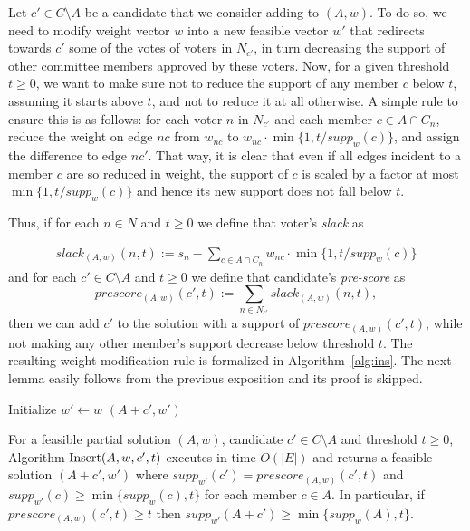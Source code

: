 Let $c'\in C\setminus A$ be a candidate that we consider adding to $(A,w)$. To do so, we need to modify weight vector $w$ into a new feasible vector $w'$ that redirects towards $c'$ some of the votes of voters in $N_{c'}$, in turn decreasing the support of other committee members approved by these voters. Now, for a given threshold $t\geq 0$, we want to make sure not to reduce the support of any member $c$ below $t$, assuming it starts above $t$, and not to reduce it at all otherwise. A simple rule to ensure this is as follows: for each voter $n$ in $N_{c'}$ and each member $c\in A\cap C_n$, reduce the weight on edge $nc$ from $w_{nc}$ to $w_{nc}\cdot \min\{1, t/supp_w(c)\}$, and assign the difference to edge $nc'$. That way, it is clear that even if all edges incident to a member $c$ are so reduced in weight, the support of $c$ is scaled by a factor at most $\min\{1, t/supp_w(c)\}$ and hence its new support does not fall below $t$.

Thus, if for each $n\in N$ and $t\geq 0$ we define that voter's \emph{slack} as

\begin{align}
    slack_{(A,w)}(n,t):= s_n - \sum_{c\in A\cap C_n} w_{nc} \cdot\min \Big\{ 1, t/supp_w(c)\Big\} \label{eq:slack}
\end{align}
%
and for each $c'\in C\setminus A$ and $t\geq 0$ we define that candidate's \emph{pre-score} as
%
\begin{equation}\label{eq:prescore}
    prescore_{(A,w)}(c',t) := \sum_{n\in N_{c'}} slack_{(A,w)}(n,t),
\end{equation}
%
then we can add $c'$ to the solution with a support of $prescore_{(A,w)}(c',t)$, while not making any other member's support decrease below threshold $t$. The resulting weight modification rule is formalized in Algorithm~\ref{alg:ins}. The next lemma easily follows from the previous exposition and its proof is skipped.

\begin{algorithm}[htb]\label{alg:ins}
\SetAlgoLined
{}
Initialize $w'\leftarrow w$\;
\Return $(A+c',w')$\;
 \caption{$\ins(A,w,c',t)$}
\end{algorithm}

\begin{lemma}\label{lem:insert}
For a feasible partial solution $(A,w)$, candidate $c'\in C\setminus A$ and threshold $t\geq 0$, 
Algorithm $\ins(A,w,c',t)$ executes in time $O(|E|)$ and returns a feasible solution $(A+c',w')$ 
where $supp_{w'}(c')=prescore_{(A,w)}(c',t)$ and $supp_{w'}(c)\geq \min\{supp_w(c),t\}$ for each member $c\in A$. 
In particular, if $prescore_{(A,w)}(c',t)\geq t$ then $supp_{w'}(A+c')\geq \min\{supp_w(A),t\}$.
\end{lemma}

